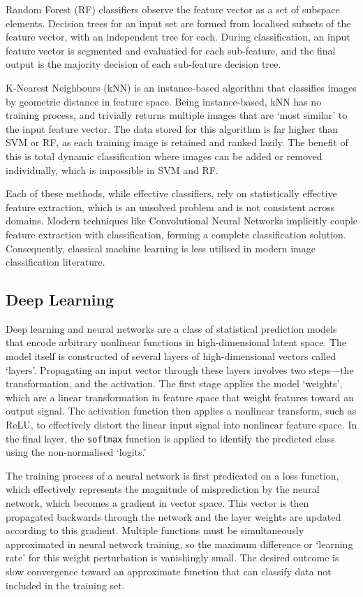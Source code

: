 \documentclass[10pt, a4paper]{article}
\begin{document}
Random Forest (RF) classifiers observe the feature vector as a set of subspace elements\cite{breiman_random_2001}. Decision trees for an input set are formed from localised subsets of the feature vector, with an independent tree for each. During classification, an input feature vector is segmented and evaluatied for each sub-feature, and the final output is the majority decision of each sub-feature decision tree.

K-Nearest Neighbours (kNN) is an instance-based algorithm that classifies images by geometric distance in feature space\cite{cover_nearest_1967}. Being instance-based, kNN has no training process, and trivially returns multiple images that are `most similar' to the input feature vector. The data stored for this algorithm is far higher than SVM or RF, as each training image is retained and ranked lazily. The benefit of this is total dynamic classification where images can be added or removed individually, which is impossible in SVM and RF.

Each of these methods, while effective classifiers, rely on statistically effective feature extraction, which is an unsolved problem and is not consistent across domains. Modern techniques like Convolutional Neural Networks implicitly couple feature extraction with classification, forming a complete classification solution\cite{lecun_gradient-based_1998}. Consequently, classical machine learning is less utilised in modern image classification literature.

\subsection{Deep Learning}
Deep learning and neural networks are a class of statistical prediction models that encode arbitrary nonlinear functions in high-dimensional latent space. The model itself is constructed of several layers of high-dimensional vectors called `layers'. Propagating an input vector through these layers involves two steps---the transformation, and the activation. The first stage applies the model `weights', which are a linear transformation in feature space that weight features toward an output signal. The activation function then applies a nonlinear transform, such as ReLU, to effectively distort the linear input signal into nonlinear feature space. In the final layer, the \texttt{softmax} function is applied to identify the predicted class using the non-normalised `logits.' \cite{rumelhart_learning_1986}

The training process of a neural network is first predicated on a loss function, which effectively represents the magnitude of misprediction by the neural network, which becomes a gradient in vector space. This vector is then propagated backwards through the network and the layer weights are updated according to this gradient. Multiple functions must be simultaneously approximated in neural network training, so the maximum difference or `learning rate' for this weight perturbation is vanishingly small. The desired outcome is slow convergence toward an approximate function that can classify data not included in the training set. 
\end{document}
